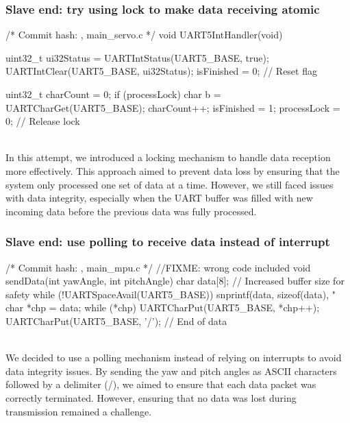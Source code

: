 \documentclass[12pt, a4paper]{article}
\begin{document}
\subsubsection{Slave end: try using lock to make data receiving atomic}\text{}
\begin{code}
/* Commit hash: , main_servo.c */
void UART5IntHandler(void) {
    uint32_t ui32Status = UARTIntStatus(UART5_BASE, true);
    UARTIntClear(UART5_BASE, ui32Status);
    isFinished = 0; // Reset flag

    uint32_t charCount = 0;
    if (processLock) {
        char b = UARTCharGet(UART5_BASE);
        charCount++;
    }
    isFinished = 1;
    processLock = 0; // Release lock
}
\end{code}\text{}\\
In this attempt, we introduced a locking mechanism to handle data reception more effectively. 
This approach aimed to prevent data loss by ensuring that the system only processed one set of data 
at a time. However, we still faced issues with data integrity, especially when the UART buffer was 
filled with new incoming data before the previous data was fully processed.

\subsubsection{Slave end: use polling to receive data instead of interrupt}\text{}
\begin{code}
/* Commit hash: , main_mpu.c */ //FIXME: wrong code included
void sendData(int yawAngle, int pitchAngle) {
    char data[8]; // Increased buffer size for safety
    while (!UARTSpaceAvail(UART5_BASE)) {}
    snprintf(data, sizeof(data), "%
    char *chp = data;
    while (*chp) {
        UARTCharPut(UART5_BASE, *chp++);
    }
    UARTCharPut(UART5_BASE, '/'); // End of data
}
\end{code}\text{}\\
We decided to use a polling mechanism instead of relying on interrupts to avoid data integrity issues. 
By sending the yaw and pitch angles as ASCII characters followed by a delimiter (/), 
we aimed to ensure that each data packet was correctly terminated. 
However, ensuring that no data was lost during transmission remained a challenge.
\end{document}
